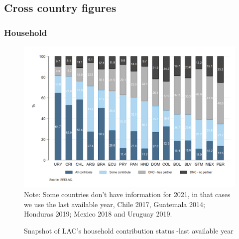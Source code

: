 \documentclass[english]{article}
\begin{document}
\subsection{Cross country figures}
\subsubsection{Household}
\begin{figure}[!htb]
    \centering
     \caption{Snapshot of LAC’s household contribution status -last available year}     \includegraphics[scale=.3]{latex/figures/Household/snapshot_household.png}
    \label{fig:Householdlastyear}
    \footnotesize{Note: Some countries don’t have information for 2021, in that cases we use the last available year, Chile 2017, Guatemala 2014; Honduras 2019; Mexico 2018 and Uruguay 2019.}
\end{figure}
\end{document}
